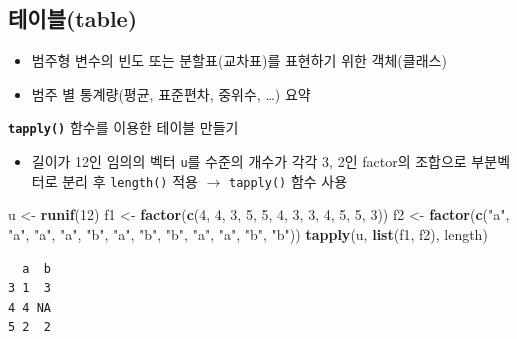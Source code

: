 \documentclass[
  11pt,
]{krantz}
\newenvironment{Shaded}{\begin{snugshade}}{\end{snugshade}}
\newcommand{\DecValTok}[1]{\textcolor[rgb]{0.06,0.06,0.06}{#1}}
\newcommand{\KeywordTok}[1]{\textcolor[rgb]{0.27,0.27,0.27}{\textbf{#1}}}
\newcommand{\NormalTok}[1]{#1}
\newcommand{\StringTok}[1]{\textcolor[rgb]{0.5,0.5,0.5}{#1}}
\providecommand{\tightlist}{%
  \setlength{\itemsep}{0pt}\setlength{\parskip}{0pt}}
\begin{document}
\normalsize

\hypertarget{table}{%
\subsection{테이블(table)}\label{table}}

\begin{itemize}
\tightlist
\item
  범주형 변수의 빈도 또는 분할표(교차표)를 표현하기 위한 객체(클래스)
\item
  범주 별 통계량(평균, 표준편차, 중위수, \ldots) 요약
\end{itemize}

\textbf{\texttt{tapply()}} 함수를 이용한 테이블 만들기

\begin{itemize}
\tightlist
\item
  길이가 12인 임의의 벡터 \texttt{u}를 수준의 개수가 각각 3, 2인 factor의 조합으로 부분벡터로 분리 후 \texttt{length()} 적용 \(\rightarrow\) \texttt{tapply()} 함수 사용
\end{itemize}

\footnotesize

\begin{Shaded}
\begin{Highlighting}[]
\NormalTok{u <-}\StringTok{ }\KeywordTok{runif}\NormalTok{(}\DecValTok{12}\NormalTok{)}
\NormalTok{f1 <-}\StringTok{ }\KeywordTok{factor}\NormalTok{(}\KeywordTok{c}\NormalTok{(}\DecValTok{4}\NormalTok{, }\DecValTok{4}\NormalTok{, }\DecValTok{3}\NormalTok{, }\DecValTok{5}\NormalTok{, }\DecValTok{5}\NormalTok{, }\DecValTok{4}\NormalTok{, }
               \DecValTok{3}\NormalTok{, }\DecValTok{3}\NormalTok{, }\DecValTok{4}\NormalTok{, }\DecValTok{5}\NormalTok{, }\DecValTok{5}\NormalTok{, }\DecValTok{3}\NormalTok{))}
\NormalTok{f2 <-}\StringTok{ }\KeywordTok{factor}\NormalTok{(}\KeywordTok{c}\NormalTok{(}\StringTok{"a"}\NormalTok{, }\StringTok{"a"}\NormalTok{, }\StringTok{"a"}\NormalTok{, }\StringTok{"a"}\NormalTok{, }\StringTok{"b"}\NormalTok{, }\StringTok{"a"}\NormalTok{, }
               \StringTok{"b"}\NormalTok{, }\StringTok{"b"}\NormalTok{, }\StringTok{"a"}\NormalTok{, }\StringTok{"a"}\NormalTok{, }\StringTok{"b"}\NormalTok{, }\StringTok{"b"}\NormalTok{))}
\KeywordTok{tapply}\NormalTok{(u, }\KeywordTok{list}\NormalTok{(f1, f2), length)}
\end{Highlighting}
\end{Shaded}

\begin{verbatim}
  a  b
3 1  3
4 4 NA
5 2  2
\end{verbatim}
\end{document}
